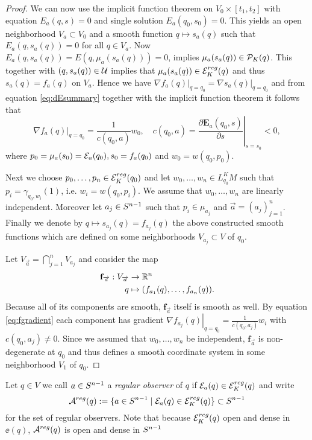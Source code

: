 \begin{proof}
    We can now use the implicit function theorem on $V_0\times [t_1,t_2]$ with equation $E_a(q,s)=0$ and single solution $E_a(q_0,s_0)=0$. This yields an open neighborhood $V_a\subset V_0$ and a smooth function $q\mapsto s_a(q)$ such that $E_a(q,s_a(q)) = 0$ for all $q \in V_a$. Now $E_a(q,s_a(q)) = E(q,\mu_a(s_a(q)))=0$, implies $\mu_a(s_a(q))\in {{\mathcal{P}}_K(q)}$. This together with $(q,s_a(q))\in \mathcal{U}$ implies that $\mu_a(s_a(q))\in {{\mathcal{E}}^{reg}_K}(q)$ and thus $s_a(q) = f_a(q)$ on $V_a$. Hence we have $\left.\nabla f_a(q)\right\rvert_{q=q_0} = \left.\nabla s_a(q)\right\rvert_{q=q_0}$ and from equation \ref{eq:dEsummary} together with the implicit function theorem it follows that 
    \begin{equation}\label{eq:fgradient}
        \left.\nabla f_a(q)\right\rvert_{q=q_0}  = \frac{1}{c(q_0,a)}w_0, \quad 
        c(q_0,a) = \left.\frac{\partial\mathbf{E}_a(q_0,s)}{\partial s}\right\rvert_{s=s_0} < 0,
    \end{equation}
    where $p_0 = \mu_a(s_0)={\mathcal{E}}_a(q_0), s_0 = f_a(q_0)$ and $w_0=w(q_0,p_0)$.
    
    Next we choose $p_0, \dots, p_n \in {{\mathcal{E}}^{reg}_K}(q_0)$ and let $w_0,\dots,w_n\in L^K_{q_0}M$ such that $p_i = \gamma_{q_0,w_i}(1)$, i.e. $w_i=w(q_0,p_i)$. We assume that $w_0,\dots,w_n$ are linearly independent. Moreover let $a_j \in {S^{n-1}}$ such that $p_i\in \mu_{a_j}$ and $\overrightarrow{a}=(a_j)^n_{j=1}$.
    Finally we denote by $q\mapsto s_{a_j}(q)=f_{a_j}(q)$ the above constructed smooth functions which are defined on some neighborhoods $V_{a_j}\subset V$ of $q_0$.
    
    Let $V_{\overrightarrow{a}} = \bigcap_{j=1}^n V_{a_j}$ and consider the map
    \begin{align*}
        \mathbf{f}_{\overrightarrow{a}}:V_{\overrightarrow{a}}&\to \mathbb{R}^n\\
        q&\mapsto (f_{a_1}(q),\dots,f_{a_n}(q)).
    \end{align*}
    Because all of its components are smooth, $\mathbf{f}_{\overrightarrow{a}}$ itself is smooth as well. By equation \ref{eq:fgradient} each component has gradient $\left.\nabla f_{a_j}(q)\right\rvert_{q=q_0} = \frac{1}{c(q_0,a_j)}w_i$ with $c(q_0,a_j)\neq 0$. Since we assumed that $w_0,\dots,w_n$ be independent, $\mathbf{f}_{\overrightarrow{a}}$ is non-degenerate at $q_0$ and thus defines a smooth coordinate system in some neighborhood $V_1$  of $q_0$.
\end{proof}

\begin{definition}
    Let $q\in V$ we call $a\in {S^{n-1}}$ a \emph{regular observer} of $q$ if ${\mathcal{E}}_{a}(q)\in {{\mathcal{E}}^{reg}_K}(q)$ and write 
    \[
        {\mathcal{A}}^{reg}(q) := \{ a\in {S^{n-1}} \mid {\mathcal{E}}_{a}(q)\in {{\mathcal{E}}^{reg}_K}(q) \} \subset {S^{n-1}}
    \] for the set of regular observers. Note that because ${{\mathcal{E}}^{reg}_K}(q)$ open and dense in $\ee(q)$, ${{\mathcal{A}}^{reg}}(q)$ is open and dense in ${S^{n-1}}$
\end{definition}


